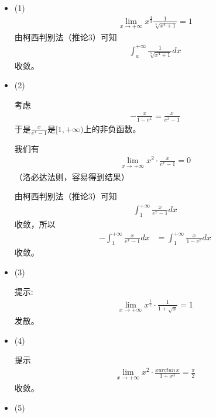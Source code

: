 \documentclass{article}
\begin{document}
\begin{itemize}
  \item (1)
        \begin{align*}
          \lim\limits_{x \to +\infty} x^{\frac{4}{3}} \frac{1}{\sqrt[3]{x^4 + 1}} = 1
        \end{align*}
        由柯西判别法（推论3）可知
        \begin{align*}
          \int_{a}^{+\infty} \frac{1}{\sqrt[3]{x^4 + 1}} dx
        \end{align*}
        收敛。

  \item (2)

        考虑
        \begin{align*}
          - \frac{x}{1 - e^x} = \frac{x}{e^{x} - 1}
        \end{align*}
        于是$\frac{x}{e^{x} - 1}$是$[1, +\infty)$上的非负函数。

        我们有
        \begin{align*}
          \lim\limits_{x \to +\infty} x^2 \cdot \frac{x}{e^{x} - 1} = 0
        \end{align*}
        （洛必达法则，容易得到结果）

        由柯西判别法（推论3）可知
        \begin{align*}
          \int_{1}^{+\infty} \frac{x}{e^{x} - 1} dx
        \end{align*}
        收敛，所以
        \begin{align*}
          - \int_{1}^{+\infty} \frac{x}{e^{x} - 1} dx
           & = \int_{1}^{+\infty} \frac{x}{1 - e^x} dx
        \end{align*}
        收敛。

  \item (3)

        提示:
        \begin{align*}
          \lim \limits_{x \to +\infty} x^{\frac{1}{2}} \cdot \frac{1}{1 + \sqrt{x}} = 1
        \end{align*}
        发散。

  \item (4)

        提示
        \begin{align*}
          \lim \limits_{x \to +\infty} x^2 \cdot \frac{x arctan\, x}{1 + x^3} = \frac{\pi}{2}
        \end{align*}
        收敛。

  \item (5)


\end{itemize}
\end{document}
